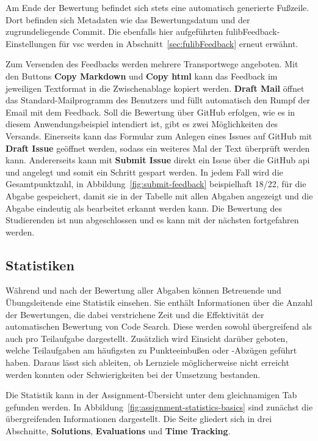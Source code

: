 Am Ende der Bewertung befindet sich stets eine automatisch generierte Fußzeile.
Dort befinden sich Metadaten wie das Bewertungsdatum und der zugrundeliegende Commit.
Die ebenfalls hier aufgeführten fulibFeedback-Einstellungen für \ac{vsc} werden in Abschnitt~\ref{sec:fulibFeedback} erneut erwähnt.

Zum Versenden des Feedbacks werden mehrere Transportwege angeboten.
Mit den Buttons \textbf{Copy Markdown} und \textbf{Copy \acs{html}} kann das Feedback im jeweiligen Textformat in die Zwischenablage kopiert werden.
\textbf{Draft Mail} öffnet das Standard-Mailprogramm des Benutzers und füllt automatisch den Rumpf der Email mit dem Feedback.
Soll die Bewertung über GitHub erfolgen, wie es in diesem Anwendungsbeispiel intendiert ist, gibt es zwei Möglichkeiten des Versands.
Einerseits kann das Formular zum Anlegen eines Issues auf GitHub mit \textbf{Draft Issue} geöffnet werden, sodass ein weiteres Mal der Text überprüft werden kann.
Andererseits kann mit \textbf{Submit Issue} direkt ein Issue über die GitHub \ac{api} und angelegt und somit ein Schritt gespart werden.
In jedem Fall wird die Gesamtpunktzahl, in Abbildung~\ref{fig:submit-feedback} beispielhaft 18/22, für die Abgabe gespeichert, damit sie in der Tabelle mit allen Abgaben angezeigt und die Abgabe eindeutig als bearbeitet erkannt werden kann.
Die Bewertung des Studierenden ist nun abgeschlossen und es kann mit der nächsten fortgefahren werden.

\subsection{Statistiken}\label{subsec:statistics}

Während und nach der Bewertung aller Abgaben können Betreuende und Übungsleitende eine Statistik einsehen.
Sie enthält Informationen über die Anzahl der Bewertungen, die dabei verstrichene Zeit und die Effektivität der automatischen Bewertung von Code Search.
Diese werden sowohl übergreifend als auch pro Teilaufgabe dargestellt.
Zusätzlich wird Einsicht darüber geboten, welche Teilaufgaben am häufigsten zu Punkteeinbußen oder -Abzügen geführt haben.
Daraus lässt sich ableiten, ob Lernziele möglicherweise nicht erreicht werden konnten oder Schwierigkeiten bei der Umsetzung bestanden.

Die Statistik kann in der Assignment-Übersicht unter dem gleichnamigen Tab gefunden werden.
In Abbildung~\ref{fig:assignment-statistics-basics} sind zunächst die übergreifenden Informationen dargestellt.
Die Seite gliedert sich in drei Abschnitte, \textbf{Solutions}, \textbf{Evaluations} und \textbf{Time Tracking}.

